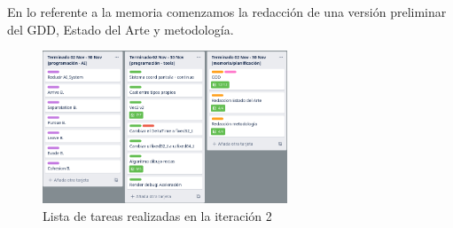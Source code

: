 En lo referente a la memoria comenzamos la redacción de una versión preliminar del \ac{GDD},
Estado del Arte y metodología. 

\begin{figure}[ht]
\centering
\includegraphics[width=0.65\textwidth]{imagenes/metodologia/tareas_it2.png}
\caption{Lista de tareas realizadas en la iteración 2}
\label{img:it_2}
\end{figure}